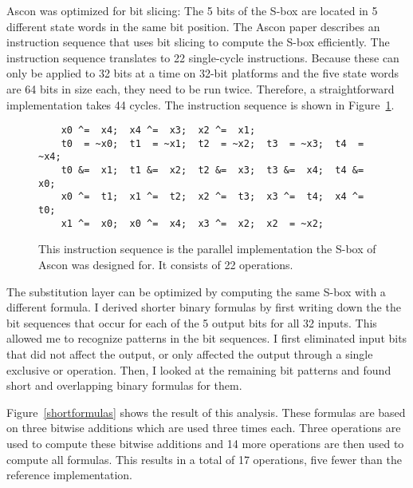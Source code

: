 Ascon was optimized for bit slicing: The 5 bits of the S-box are located in 5
different state words in the same bit position. The Ascon paper describes an
instruction sequence that uses bit slicing to compute the S-box efficiently.
The instruction sequence translates to 22 single-cycle instructions.
Because these can only be applied to 32 bits at a time on 32-bit platforms and
the five state words are 64 bits in size each, they need to be run twice.
Therefore, a straightforward implementation takes 44 cycles. The instruction
sequence is shown in Figure~\ref{originalsbox}.

\begin{figure}
\begin{verbatim}
    x0 ^=  x4;  x4 ^=  x3;  x2 ^=  x1;
    t0  = ~x0;  t1  = ~x1;  t2  = ~x2;  t3  = ~x3;  t4  = ~x4;
    t0 &=  x1;  t1 &=  x2;  t2 &=  x3;  t3 &=  x4;  t4 &=  x0;
    x0 ^=  t1;  x1 ^=  t2;  x2 ^=  t3;  x3 ^=  t4;  x4 ^=  t0;
    x1 ^=  x0;  x0 ^=  x4;  x3 ^=  x2;  x2  = ~x2;
\end{verbatim}

\caption{This instruction sequence is the parallel implementation the S-box of
Ascon was designed for. It consists of 22 operations.}

\label{originalsbox}
\end{figure}

The substitution layer can be optimized by computing the same S-box with a
different formula. I derived shorter binary formulas by first writing down the
the bit sequences that occur for each of the 5 output bits for all 32 inputs.
This allowed me to recognize patterns in the bit sequences. I first eliminated
input bits that did not affect the output, or only affected the output through a
single exclusive or operation. Then, I looked at the remaining bit patterns and
found short and overlapping binary formulas for them.

Figure~\ref{shortformulas} shows the result of this analysis. These formulas are
based on three bitwise additions which are used three times each. Three
operations are used to compute these bitwise additions and 14 more operations
are then used to compute all formulas. This results in a total of 17 operations,
five fewer than the reference implementation.

